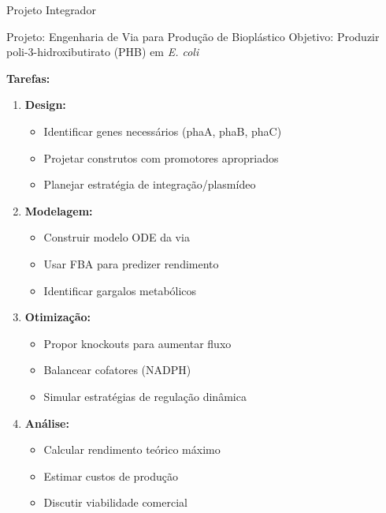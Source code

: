 \begin{frame}{Projeto Integrador}
\begin{alertblock}{Projeto: Engenharia de Via para Produção de Bioplástico}
Objetivo: Produzir poli-3-hidroxibutirato (PHB) em \textit{E. coli}

\textbf{Tarefas:}
\begin{enumerate}
    \item \textbf{Design:}
    \begin{itemize}
        \item Identificar genes necessários (phaA, phaB, phaC)
        \item Projetar construtos com promotores apropriados
        \item Planejar estratégia de integração/plasmídeo
    \end{itemize}

    \item \textbf{Modelagem:}
    \begin{itemize}
        \item Construir modelo ODE da via
        \item Usar FBA para predizer rendimento
        \item Identificar gargalos metabólicos
    \end{itemize}

    \item \textbf{Otimização:}
    \begin{itemize}
        \item Propor knockouts para aumentar fluxo
        \item Balancear cofatores (NADPH)
        \item Simular estratégias de regulação dinâmica
    \end{itemize}

    \item \textbf{Análise:}
    \begin{itemize}
        \item Calcular rendimento teórico máximo
        \item Estimar custos de produção
        \item Discutir viabilidade comercial
    \end{itemize}
\end{enumerate}
\end{alertblock}
\end{frame}

